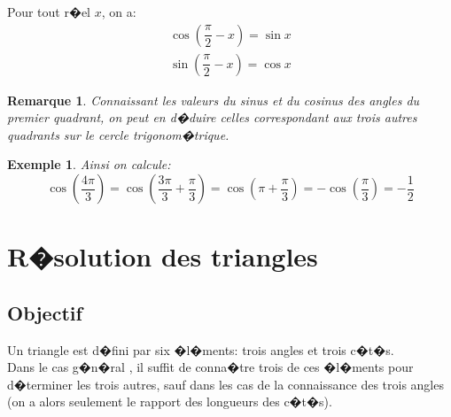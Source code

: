 \documentclass[11pt,dvips]{article}
\theoremstyle{break}
\theoremstyle{nonumberbreak}
\newtheorem{Ex}{Exemple}
\newtheorem{Rem}{Remarque}
\begin{document}
\begin{Prop}
Pour tout r�el $x$, on a:
\begin{gather*}
\cos\left(\dfrac{\pi}{2}-x\right)=\sin x\\
\sin\left(\dfrac{\pi}{2}-x\right)=\cos x
\end{gather*}
\end{Prop}
\begin{Rem}
Connaissant les valeurs du sinus et du cosinus des angles du premier quadrant, on peut en d�duire celles correspondant aux trois autres quadrants sur le cercle trigonom�trique.
\end{Rem}
\begin{Ex}
Ainsi on calcule:
\[\cos\left(\dfrac{4\pi}{3}\right)=\cos\left(\dfrac{3\pi}{3}+\dfrac{\pi}{3}\right)=\cos\left(\pi+\dfrac{\pi}{3}\right)=-\cos\left(\dfrac{\pi}{3}\right)=-\dfrac{1}{2}\]
\end{Ex}

\section{R�solution des triangles}
\subsection{Objectif}
Un triangle est d�fini par six �l�ments: trois angles et trois c�t�s.\\
Dans le cas g�n�ral , il suffit de conna�tre trois de ces �l�ments pour d�terminer les trois autres, sauf dans les cas de  la connaissance des trois angles (on a alors seulement le rapport des longueurs des c�t�s).
\end{document}

